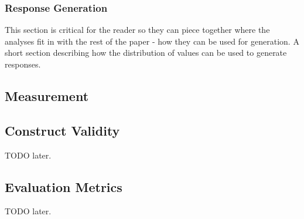 \subsubsection{Response Generation}
\textcolor{black!40}{This section is critical for the reader so they can piece together where the analyses fit in with the rest of the paper - how they can be used for generation. A short section describing how the distribution of values can be used to generate responses.}

\subsection{Measurement}
\textcolor{black!30}{\lipsum[14-15]}

\subsection{Construct Validity}
TODO later.

\subsection{Evaluation Metrics}
TODO later.




